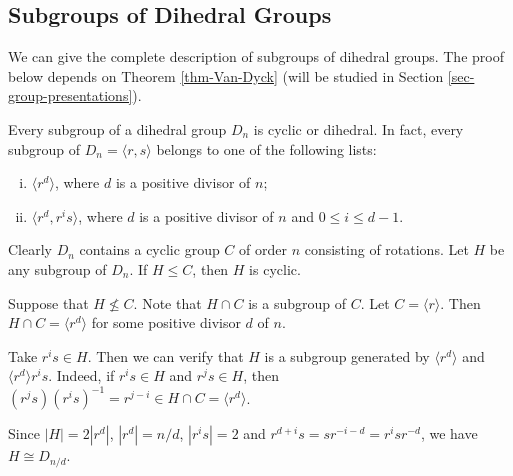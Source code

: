\subsection{Subgroups of Dihedral Groups}
We can give the complete description of subgroups of dihedral groups. The proof below depends on Theorem \ref{thm-Van-Dyck} (will be studied in Section \ref{sec-group-presentations}).


\begin{theorem} \label{thm-subgrp-of-Dn}
	 Every subgroup of a dihedral group $D_{n}$ is cyclic or dihedral. In fact, every subgroup of $D_n = \langle r,s\rangle$ belongs to one of the following lists:
	 \begin{enumerate}[(i)]
	 	\item $\langle r^d \rangle$, where $d$ is a positive divisor of $n$;
	 	\item $\langle r^d, r^is\rangle$, where $d$ is a positive divisor of $n$ and $0\leq i\leq d-1$.
	 \end{enumerate}
\end{theorem}
\begin{sketch}
	Clearly $D_n$ contains a cyclic group $C$ of order $n$ consisting of rotations.  Let $H$ be any subgroup of $D_n$. If $H  \leq C$,
	then $H$ is cyclic. 
	
	Suppose that $H\not\leq C$. Note that $H \cap C$ is a  subgroup of $C$. Let $C = \langle r\rangle$. Then $H\cap C = \langle r^d\rangle$ for some positive divisor $d$ of $n$. 
	
	Take $r^i s\in H$. Then we can verify that $H$ is a subgroup generated by $\langle r^d\rangle$ and $\langle r^d\rangle r^is$. Indeed, if $r^i s\in H$ and $r^j s\in H$, then $(r^js)(r^is)^{-1} = r^{j-i}\in H\cap C = \langle r^d\rangle$. 
	
	Since $|H| = 2|r^d|$,   $|r^d| = n/d$, $|r^i s| = 2$ and $r^{d+i}s = sr^{-i-d} = r^{i}sr^{-d}$, we have   $H\cong D_{n/d}$.
\end{sketch}


